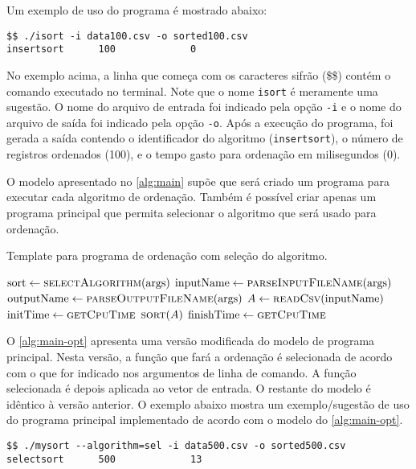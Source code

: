 \documentclass[a4paper,12pt]{scrartcl}
\begin{document}
Um exemplo de uso do programa é mostrado abaixo:\\

\begin{verbatim}
$$ ./isort -i data100.csv -o sorted100.csv
insertsort      100             0
\end{verbatim}

No exemplo acima, a linha que começa com os caracteres sifrão (\$\$) contém o
comando executado no terminal. Note que o nome \texttt{isort} é meramente uma
sugestão. O nome do arquivo de entrada foi indicado pela opção \texttt{-i} e o
nome do arquivo de saída foi indicado pela opção \texttt{-o}. Após a execução do
programa, foi gerada a saída contendo o identificador do algoritmo
(\texttt{insertsort}), o número de registros ordenados (100), e o tempo gasto
para ordenação em milisegundos (0).

O modelo apresentado no \autoref{alg:main} supõe que será criado um programa
para executar cada algoritmo de ordenação. Também é possível criar apenas um
programa principal que permita selecionar o algoritmo que será usado para
ordenação.

\begin{algorithm}
  \caption{Template para programa de ordenação com seleção do algoritmo.}
  \label{alg:main-opt}
  \begin{algorithmic}
    \State $\text{sort}\gets\Call{selectAlgorithm}{\text{args}}$
    \State $\text{inputName}\gets\Call{parseInputFileName}{\text{args}}$
    \State $\text{outputName}\gets\Call{parseOutputFileName}{\text{args}}$
    \State $A\gets\Call{readCsv}{\text{inputName}}$
    \State $\text{initTime}\gets\Call{getCpuTime}{}$
    \State $\Call{sort}{A}$
    \State $\text{finishTime}\gets\Call{getCpuTime}{}$
    \State {}
    \State {}
\EndProcedure
\end{algorithmic}
\end{algorithm}

O \autoref{alg:main-opt} apresenta uma versão modificada do modelo de programa
principal. Nesta versão, a função que fará a ordenação é selecionada de acordo
com o que for indicado nos argumentos de linha de comando. A função selecionada
é depois aplicada ao vetor de entrada. O restante do modelo é idêntico à versão
anterior. O exemplo abaixo mostra um exemplo/sugestão de uso do programa
principal implementado de acordo com o modelo do \autoref{alg:main-opt}.

\begin{verbatim}
$$ ./mysort --algorithm=sel -i data500.csv -o sorted500.csv
selectsort      500             13
\end{verbatim}
\end{document}
